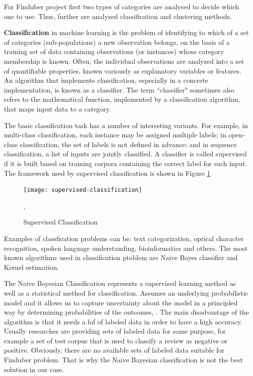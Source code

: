 For Finduber project first two types of categories are analysed to decide which one to use. Thus, further are analyzed classification and clustering methods.

\textbf{Classification} in machine learning is the problem of identifying to which of a set of categories (sub-populations) a new observation belongs, on the basis of a training set of data containing observations (or instances) whose category membership is known. Often, the individual observations are analyzed into a set of quantifiable properties, known variously as explanatory variables or features. An algorithm that implements classification, especially in a concrete implementation, is known as a classifier. The term ``classifier" sometimes also refers to the mathematical function, implemented by a classification algorithm, that maps input data to a category.

The basic classification task has a number of interesting variants. For example, in multi-class classification, each instance may be assigned multiple labels; in open-class classification, the set of labels is not defined in advance; and in sequence classification, a list of inputs are jointly classified. A classifier is called supervised if it is built based on training corpora containing the correct label for each input. The framework used by supervised classification is shown in Figure \ref{classification}

\begin{figure}[!ht]
\centering
\texttt{[image: supervised-classification]}
\caption{Supervised Classification}\label{classification}, \cite{nltk}
\end{figure}

Examples of classfication problems can be: text categorization, oprical character recognition, spoken language understanding, bioinformatics and others. The most known algorithms used in classification ptoblem are Naive Bayes classifier and Kernel estimation.

The Naive Bayesian Classification represents a supervised learning method as well as a statistical method for classification. Assumes an underlying probabilistic model and it allows us to capture uncertainty about the model in a principled way by determining probabilities of the outcomes, \cite{bayesian}. The main disadvantage of the algorithm is that it needs a lof of labeled data in order to have a high accuracy. Usually researches are providing sets of labeled data for some purpose, for example a set of test corpus that is used to classify a review as negative or positive. Obviously, there are no available sets of labeled data suitable for Finduber problem. That is why the Naive Bayesian classification is not the best solution in our case. 


